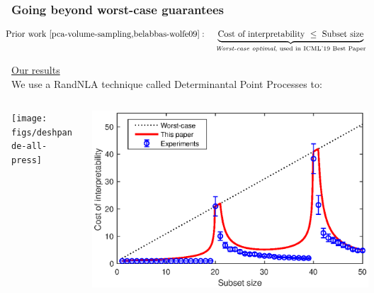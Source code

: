 \message{ !name(nystrom-press.tex)}\documentclass[10pt,handout]{beamer}
\begin{document}
\begin{frame}
\begin{columns}
\begin{column}{0.27\textwidth}
\begin{center}
    \end{center}
  \end{column}
\end{columns}



\end{frame}


\begin{frame}
  \frametitle{Going beyond worst-case guarantees}
  \begin{align*}
\hspace{-3mm}\text{Prior work \cite{pca-volume-sampling,belabbas-wolfe09}}:\quad
    \underbrace{\text{Cost of interpretability}\ 
\leq\  \text{Subset size}}_{\text{\textit{Worst-case optimal}, used in ICML'19
    Best Paper}} %
  \end{align*}  
\vspace{4mm}

\underline{Our results}\\
We use a RandNLA technique called Determinantal Point Processes to:
  \vspace{5mm}

 \begin{columns}
   \hspace{-3mm}\begin{column}{.48\textwidth}
     \centering
{}

\texttt{[image: figs/deshpande-all-press]}
\end{column}
\begin{column}{.48\textwidth}

  \includegraphics[width=1.05\textwidth]{figs/nystrom-bounds-press}
\end{column}
\end{columns}


\end{frame}
\end{document}
